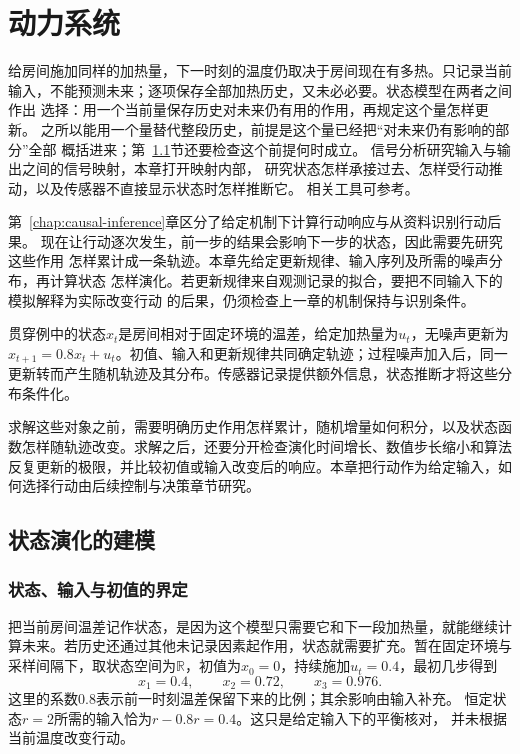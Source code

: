 \chapter{动力系统}
\label{chap:dynamical-systems-and-state-estimation}
\label{chap:action-and-state}

给房间施加同样的加热量，下一时刻的温度仍取决于房间现在有多热。只记录当前
输入，不能预测未来；逐项保存全部加热历史，又未必必要。状态模型在两者之间作出
选择：用一个当前量保存历史对未来仍有用的作用，再规定这个量怎样更新。
之所以能用一个量替代整段历史，前提是这个量已经把“对未来仍有影响的部分”全部
概括进来；第~\ref{sec:dynamical-difference-ode}节还要检查这个前提何时成立。
信号分析研究输入与输出之间的信号映射，本章打开映射内部，
研究状态怎样承接过去、怎样受行动推动，以及传感器不直接显示状态时怎样推断它。
相关工具可参考。

第~\ref{chap:causal-inference}章区分了给定机制下计算行动响应与从资料识别行动后果。
现在让行动逐次发生，前一步的结果会影响下一步的状态，因此需要先研究这些作用
怎样累计成一条轨迹。本章先给定更新规律、输入序列及所需的噪声分布，再计算状态
怎样演化。若更新规律来自观测记录的拟合，要把不同输入下的模拟解释为实际改变行动
的后果，仍须检查上一章的机制保持与识别条件。

贯穿例中的状态\(x_t\)是房间相对于固定环境的温差，给定加热量为\(u_t\)，无噪声更新为\(x_{t+1}=0.8x_t+u_t\)。初值、输入和更新规律共同确定轨迹；过程噪声加入后，同一更新转而产生随机轨迹及其分布。传感器记录提供额外信息，状态推断才将这些分布条件化。

求解这些对象之前，需要明确历史作用怎样累计，随机增量如何积分，以及状态函数怎样随轨迹改变。求解之后，还要分开检查演化时间增长、数值步长缩小和算法反复更新的极限，并比较初值或输入改变后的响应。本章把行动作为给定输入，如何选择行动由后续控制与决策章节研究。

\section{状态演化的建模}
\label{sec:dynamical-difference-ode}

\subsection{状态、输入与初值的界定}
把当前房间温差记作状态，是因为这个模型只需要它和下一段加热量，就能继续计算未来。若历史还通过其他未记录因素起作用，状态就需要扩充。暂在固定环境与采样间隔下，取状态空间为$\mathbb R$，初值为$x_0=0$，持续施加$u_t=0.4$，最初几步得到
\[
  x_1=0.4,\qquad x_2=0.72,\qquad x_3=0.976.
\]
这里的系数$0.8$表示前一时刻温差保留下来的比例；其余影响由输入补充。
恒定状态$r=2$所需的输入恰为$r-0.8r=0.4$。这只是给定输入下的平衡核对，
并未根据当前温度改变行动。

